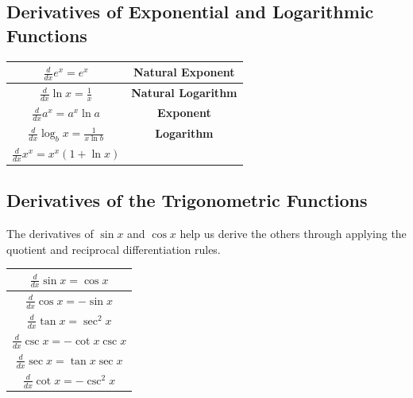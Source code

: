 \documentclass{article}
\begin{document}
        \subsection{Derivatives of Exponential and Logarithmic Functions}
            \begin{center}
                \begin{tabular}{|c|c|}
                    \hline
                    $\frac{d}{dx}e^x=e^x$ & \textbf{Natural Exponent} \\
                    \hline
                    $\frac{d}{dx}\ln{x}=\frac{1}{x}$ & \textbf{Natural Logarithm} \\
                    \hline
                    $\frac{d}{dx}a^x=a^x\ln{a}$ & \textbf{Exponent} \\
                    \hline
                    $\frac{d}{dx}\log_b{x}=\frac{1}{x\ln{b}}$ & \textbf{Logarithm} \\
                    \hline
                    $\frac{d}{dx}x^x=x^x(1+\ln{x})$ & \\
                    \hline
                \end{tabular}
            \end{center}


        \pagebreak
        \subsection{Derivatives of the Trigonometric Functions}
            The derivatives of $\sin{x}$ and $\cos{x}$ help us derive the others through applying
            the quotient and reciprocal differentiation rules. \\

            \begin{center}
                \begin{tabular}{|c|}
                    \hline
                    $\frac{d}{dx}\sin{x}=\cos{x}$ \\
                    \hline
                    $\frac{d}{dx}\cos{x}=-\sin{x}$ \\
                    \hline
                    $\frac{d}{dx}\tan{x}=\sec^2{x}$ \\
                    \hline
                    $\frac{d}{dx}\csc{x}=-\cot{x}\csc{x}$ \\
                    \hline
                    $\frac{d}{dx}\sec{x}=\tan{x}\sec{x}$ \\
                    \hline
                    $\frac{d}{dx}\cot{x}=-\csc^2{x}$ \\
                    \hline
                \end{tabular}
            \end{center}
\end{document}
